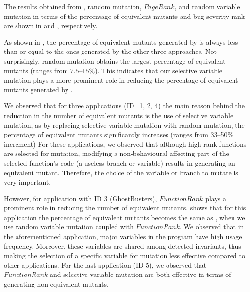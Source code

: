  \label{Sec:eval-comparison}

The results obtained from \mutandis, random mutation, $PageRank$, and random variable mutation %
 in terms of the percentage of equivalent mutants and bug severity rank are shown in  and , respectively.



As shown in , the percentage of equivalent mutants generated by \mutandis is always less than or equal to the ones generated by the other three approaches. 
Not surprisingly, random mutation obtains the largest percentage of equivalent mutants (ranges from 7.5--15\%). 
This indicates that our selective variable mutation plays a more prominent role in reducing the percentage of equivalent mutants generated by \mutandis.




We observed that for three applications (ID=1, 2, 4) the main reason behind the reduction in the number of equivalent mutants is the use of selective variable mutation, 
as by replacing selective variable mutation with random mutation,
the percentage of equivalent mutants significantly increases (ranges from 33--50\% increment)
For these applications, we observed that although high rank functions are selected for mutation, modifying a non-behavioural affecting part of the selected function's code (\ie a useless branch or variable) results in generating an equivalent mutant. Therefore, the choice of the variable or branch to mutate is very important.

However, for application with ID 3 (GhostBusters), $FunctionRank$ plays a prominent role in reducing the number of equivalent mutants.
 shows that for this application the percentage of equivalent mutants becomes the same as \mutandis, when we use random variable mutation coupled with $FunctionRank$. 
We observed that in the aforementioned application,
major variables in the program have high usage frequency. Moreover, these variables are shared among detected invariants, thus making the selection of a specific variable for mutation less
effective compared to other applications. For the last application (ID 5), we observed that $FunctionRank$ and selective variable mutation are both effective in terms of generating
non-equivalent mutants.


